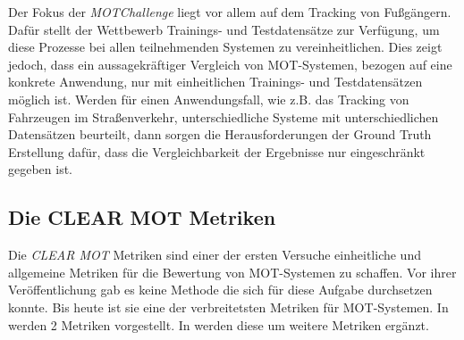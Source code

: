 Der Fokus der \textit{MOTChallenge} liegt vor allem auf dem \gls{Tracking} von Fußgängern. Dafür stellt der Wettbewerb Trainings- und Testdatensätze zur Verfügung, um diese Prozesse bei allen teilnehmenden Systemen zu vereinheitlichen. Dies zeigt jedoch, dass ein aussagekräftiger Vergleich von \gls{MOT}-Systemen, bezogen auf eine konkrete Anwendung, nur mit einheitlichen Trainings- und Testdatensätzen möglich ist. Werden für einen Anwendungsfall, wie z.B. das \gls{Tracking} von Fahrzeugen im Straßenverkehr, unterschiedliche Systeme mit unterschiedlichen Datensätzen beurteilt, dann sorgen die Herausforderungen der \gls{Ground Truth} Erstellung dafür, dass die Vergleichbarkeit der Ergebnisse nur eingeschränkt gegeben ist. 

\subsection{Die CLEAR MOT Metriken}
Die \textit{\acrshort{CLEAR} \gls{MOT}} Metriken sind einer der ersten Versuche einheitliche und allgemeine Metriken für die Bewertung von \gls{MOT}-Systemen zu schaffen. Vor ihrer Veröffentlichung gab es keine Methode die sich für diese Aufgabe durchsetzen konnte. Bis heute ist sie eine der verbreitetsten Metriken für \gls{MOT}-Systemen. In \cite{CLEAR.2008} werden 2 Metriken vorgestellt. In \cite{Kasturi.2009} werden diese um weitere Metriken ergänzt. \par

